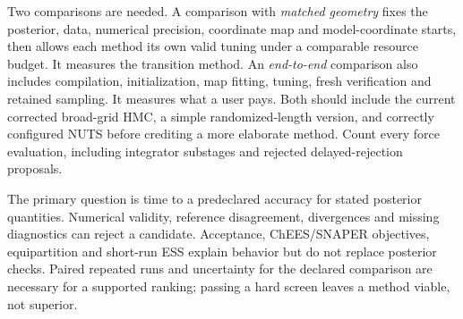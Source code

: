 Two comparisons are needed. A comparison with \emph{matched geometry} fixes the
posterior, data, numerical precision, coordinate map and model-coordinate
starts, then allows each method its own valid tuning under a comparable
resource budget. It measures the transition method. An \emph{end-to-end}
comparison also includes compilation, initialization, map fitting, tuning,
fresh verification and retained sampling. It measures what a user pays.
Both should include the current corrected broad-grid HMC, a simple
randomized-length version, and correctly configured NUTS before crediting a
more elaborate method. Count every force evaluation, including integrator
substages and rejected delayed-rejection proposals.

The primary question is time to a predeclared accuracy for stated posterior
quantities. Numerical validity, reference disagreement, divergences and
missing diagnostics can reject a candidate. Acceptance, ChEES/SNAPER
objectives, equipartition and short-run ESS explain behavior but do not
replace posterior checks. Paired repeated runs and uncertainty for the
declared comparison are necessary for a supported ranking; passing a hard
screen leaves a method viable, not superior.

